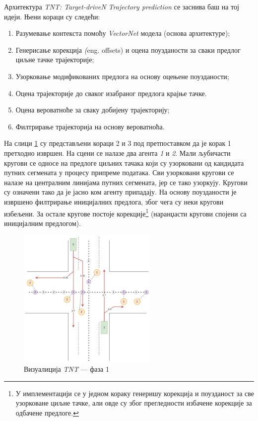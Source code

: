 \documentclass[11pt,oneside]{memoir}
\begin{document}
Архитектура \textit{TNT: Target-driveN Trajectory prediction} \cite{tnt} се заснива баш на тој идеји. Њени кораци су следећи:
\begin{enumerate}
  \item Разумевање контекста помоћу \textit{VectorNet} модела (основа архитектуре);
  \item Генерисање корекција \textit(eng. offsets) и оцена поузданости за сваки предлог циљне тачке трајекторије;
  \item Узорковање модификованих предлога на основу оцењене поузданости;
  \item Оцена трајекторије до сваког изабраног предлога крајње тачке.
  \item Оцена вероватноће за сваку добијену трајекторију;
  \item Филтрирање трајекторија на основу вероватноћа.
\end{enumerate}

На слици \ref{tnt-viz-1} су представљени кораци 2 и 3 под претпоставком да је корак 1 претходно извршен. На сцени се налазе два агента
\textit{1} и \textit{2}. Мали љубичасти кругови се односе на предлоге циљних тачака који су узорковани од кандидата путних сегмената у процесу припреме података.
Сви узорковани кругови се налазе на централним линијама путних сегмената, јер се тако узоркују. Кругови су означени тако да је јасно ком агенту припадају. На основу поузданости је 
извршено филтрирање иницијалних предлога, због чега су неки кругови избељени. За остале кругове постоје корекције\footnote{
  У имплементацији се у једном кораку генеришу корекција и поузданост за све узорковане циљне тачке, али овде су због прегледности
  избачене корекције за одбачене предлоге.
} (наранџасти кругови спојени са иницијалним предлогом).


\begin{figure}[H]
  \centering
  \includegraphics[width=0.6\textwidth]{images/tnt-viz-Page-1.drawio.png}
  \caption{Визуалиција \textit{TNT} --- фаза 1 \label{tnt-viz-1}}
\end{figure}
\end{document}

